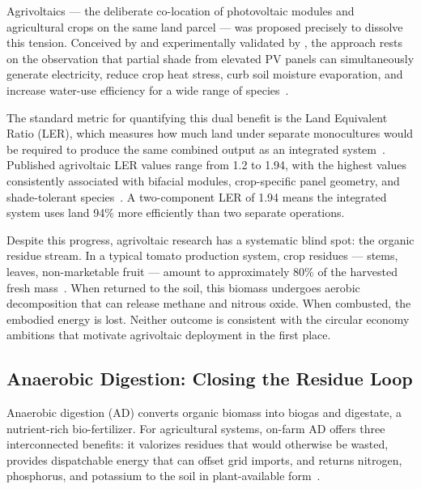 \hspace{1cm}Agrivoltaics --- the deliberate co-location of photovoltaic
modules and agricultural crops on the same land parcel --- was proposed
precisely to dissolve this tension. Conceived by \citet{goetzberger1982}
and experimentally validated by \citet{dupraz2011}, the approach rests on
the observation that partial shade from elevated PV panels can simultaneously
generate electricity, reduce crop heat stress, curb soil moisture evaporation,
and increase water-use efficiency for a wide range of
species~\citep{marrou2013, barron2019, elamri2018, semeraro2024}.

The standard metric for quantifying this dual benefit is the Land Equivalent
Ratio (LER), which measures how much land under separate monocultures would
be required to produce the same combined output as an integrated
system~\citep{mead1980}. Published agrivoltaic LER values range from 1.2 to
1.94, with the highest values consistently associated with bifacial modules,
crop-specific panel geometry, and shade-tolerant
species~\citep{riaz2022, mazzeo2025}. A two-component LER of 1.94 means
the integrated system uses land 94\% more efficiently than two separate
operations.

Despite this progress, agrivoltaic research has a systematic blind spot:
the organic residue stream. In a typical tomato production system, crop
residues --- stems, leaves, non-marketable fruit --- amount to approximately
80\% of the harvested fresh mass~\citep{mohammedi2023}. When returned to the
soil, this biomass undergoes aerobic decomposition that can release methane
and nitrous oxide. When combusted, the embodied energy is lost. Neither
outcome is consistent with the circular economy ambitions that motivate
agrivoltaic deployment in the first place.

\subsection{Anaerobic Digestion: Closing the Residue Loop}

\hspace{1cm}Anaerobic digestion (AD) converts organic biomass into biogas
and digestate, a nutrient-rich bio-fertilizer. For agricultural systems,
on-farm AD offers three interconnected benefits: it valorizes residues that
would otherwise be wasted, provides dispatchable energy that can offset grid
imports, and returns nitrogen, phosphorus, and potassium to the soil in
plant-available form~\citep{pilarski2025, lallement2023}.


